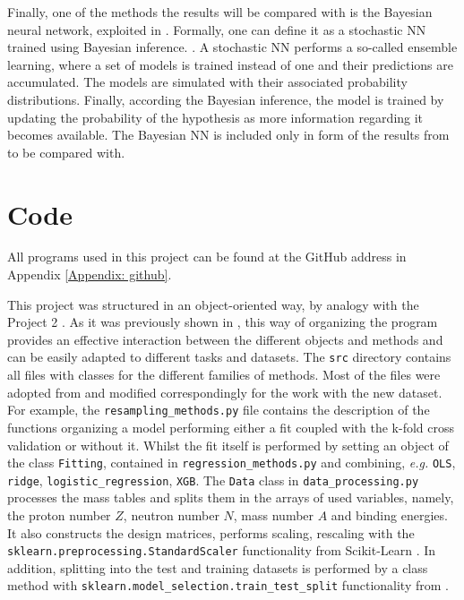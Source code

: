 \documentclass[numberedappendix, twocolappendix]{emulateapj}
\begin{document}
Finally, one of the methods the results will be compared with is the Bayesian neural network, exploited in \cite{utama2017}. Formally, one can define it as a stochastic NN trained using Bayesian inference. \cite{Bayesian}. A stochastic NN performs a so-called ensemble learning, where a set of models is trained instead of one and their predictions are accumulated. The models are simulated with their associated probability distributions. Finally, according the Bayesian inference, the model is trained by updating the probability of the hypothesis as more information regarding it becomes available. The Bayesian NN is included only in form of the results from \cite{utama2017} to be compared with.

\section{Code} \label{sec: Code}
All programs used in this project can be found at the GitHub address in Appendix \ref{Appendix: github}.

This project was structured in an object-oriented way, by analogy with the Project 2 \cite{proj2}. As it was previously shown in \cite{proj2}, this way of organizing the program provides an effective interaction between the different objects and methods and can be easily adapted to different tasks and datasets. The \texttt{src} directory contains all files with classes for the different families of methods. Most of the files were adopted from \cite{proj2} and modified correspondingly for the work with the new dataset. For example, the \texttt{resampling\_methods.py} file contains the description of the functions organizing a model performing either a fit coupled with the k-fold cross validation or without it. Whilst the fit itself is performed by setting an object of the class  \texttt{Fitting}, contained in \texttt{regression\_methods.py} and combining, \textit{e.g.}  \texttt{OLS}, \texttt{ridge}, \texttt{logistic\_regression}, \texttt{XGB}. The \texttt{Data} class in \texttt{data\_processing.py} processes the mass tables and splits them in the arrays of used variables, namely, the proton number $Z$, neutron number $N$, mass number $A$ and binding energies. It also constructs the design matrices, performs scaling, rescaling with the \texttt{sklearn.preprocessing.StandardScaler} functionality from Scikit-Learn  \cite{skl}. In addition, splitting into the test and training datasets is performed by a class method with \texttt{sklearn.model\_selection.train\_test\_split} functionality from \cite{skl}. 
\end{document}
